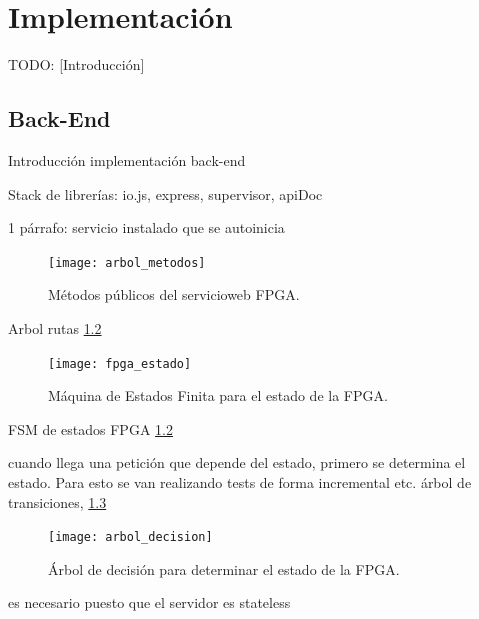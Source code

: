 \chapter{Implementación\label{cap:implementacion}}

TODO: [Introducción]


\section{Back-End\label{sec:imp:back_end}}

Introducción implementación back-end

Stack de librerías: io.js, express, supervisor, apiDoc

1 párrafo: servicio instalado que se autoinicia

\begin{figure}[!htp]
  \centering
  \texttt{[image: arbol\_metodos]}
  \caption{Métodos públicos del \gls{servicioweb} \gls{FPGA}.}
  \label{fig:arbol_metodos}
\end{figure}

Arbol rutas \ref{fig:fpga_estado}

\begin{figure}[!htp]
  \centering
  \texttt{[image: fpga\_estado]}
  \caption{Máquina de Estados Finita para el estado de la \gls{FPGA}.}
  \label{fig:fpga_estado}
\end{figure}

FSM de estados FPGA \ref{fig:fpga_estado}

cuando llega una petición que depende del estado, primero se determina el estado. Para esto se van realizando tests de forma incremental etc. árbol de transiciones, \ref{fig:arbol_decision}

\begin{figure}[!htp]
  \centering
  \texttt{[image: arbol\_decision]}
  \caption{Árbol de decisión para determinar el estado de la \gls{FPGA}.}
  \label{fig:arbol_decision}
\end{figure}
es necesario puesto que el servidor es stateless

